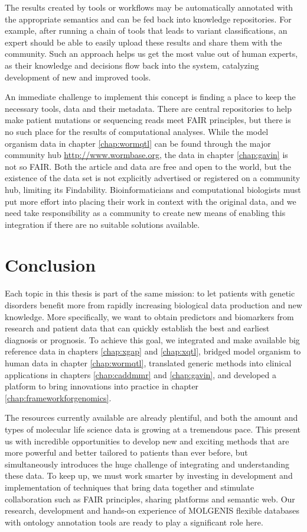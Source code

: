 The results created by tools or workflows may be automatically annotated with the appropriate semantics and can be fed back into knowledge repositories.
For example, after running a chain of tools that leads to variant classifications, an expert should be able to easily upload these results and share them with the community.
Such an approach helps us get the most value out of human experts, as their knowledge and decisions flow back into the system, catalyzing development of new and improved tools.

An immediate challenge to implement this concept is finding a place to keep the necessary tools, data and their metadata.
There are central repositories to help make patient mutations or sequencing reads meet FAIR principles, but there is no such place for the results of computational analyses.
While the model organism data in chapter \ref{chap:wormqtl} can be found through the major community hub \url{http://www.wormbase.org}, the data in chapter \ref{chap:gavin} is not so FAIR.
Both the article and data are free and open to the world, but the existence of the data set is not explicitly advertised or registered on a community hub, limiting its Findability.
Bioinformaticians and computational biologists must put more effort into placing their work in context with the original data, and we need take responsibility as a community to create new means of enabling this integration if there are no suitable solutions available.


\section{Conclusion}

Each topic in this thesis is part of the same mission: to let patients with genetic disorders benefit more from rapidly increasing biological data production and new knowledge.
More specifically, we want to obtain predictors and biomarkers from research and patient data that can quickly establish the best and earliest diagnosis or prognosis.
To achieve this goal, we integrated and make available big reference data in chapters \ref{chap:xgap} and \ref{chap:xqtl}, bridged model organism to human data in chapter \ref{chap:wormqtl}, translated generic methods into clinical applications in chapters \ref{chap:caddmmr} and \ref{chap:gavin}, and developed a platform to bring innovations into practice in chapter \ref{chap:frameworkforgenomics}.

The resources currently available are already plentiful, and both the amount and types of molecular life science data is growing at a tremendous pace.
This present us with incredible opportunities to develop new and exciting methods that are more powerful and better tailored to patients than ever before, but simultaneously introduces the huge challenge of integrating and understanding these data.
To keep up, we must work smarter by investing in development and implementation of techniques that bring data together and stimulate collaboration such as FAIR principles, sharing platforms and semantic web.
Our research, development and hands-on experience of MOLGENIS flexible databases with ontology annotation tools are ready to play a significant role here.

